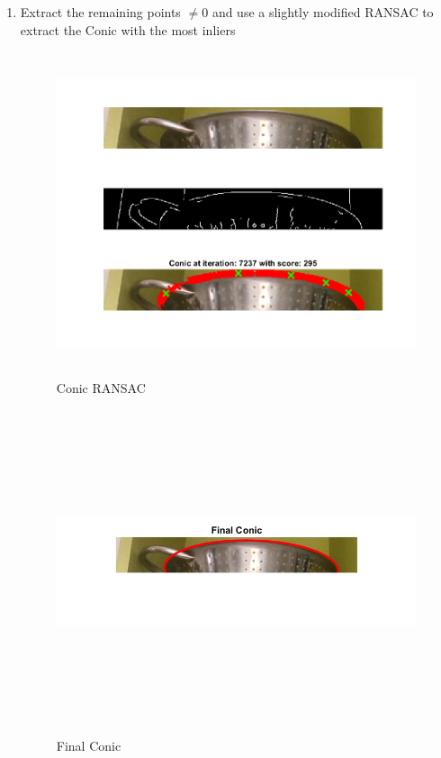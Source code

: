 \begin{enumerate}
    \item Extract the remaining points $\neq 0$ and use a slightly modified RANSAC to extract the Conic with the most inliers 
                \begin{figure}[H]
    \centering
    \includegraphics[height=9.5cm, width=\textwidth, keepaspectratio]{Report/Images/Features/Conic/ConicRANSAC.png}
    \caption{\label{fig:conic:ransac}Conic RANSAC}
    \end{figure}

                    \begin{figure}[H]
    \centering
    \includegraphics[height=9.5cm, width=\textwidth, keepaspectratio]{Report/Images/Features/Conic/FinalConic.png}
    \caption{\label{fig:conic:final}Final Conic}
    \end{figure}

    
\end{enumerate}
